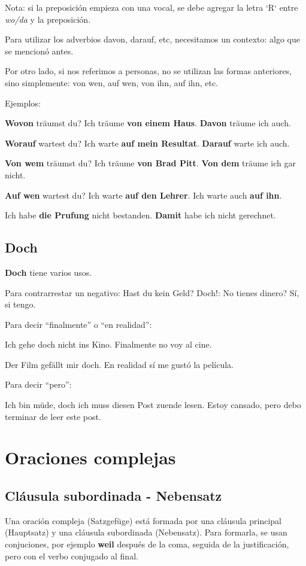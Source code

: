 Nota: si la preposición empieza con una vocal, se debe agregar la letra `R` entre \textit{wo/da} y la preposición. 

Para utilizar los adverbios davon, darauf, etc, necesitamos un contexto: algo que se mencionó antes. 

Por otro lado, si nos referimos a personas, no se utilizan las formas anteriores, sino simplemente: von wen, auf wen, von ihn, auf ihn, etc.

Ejemplos:

\textbf{Wovon} träumst du? Ich träume \textbf{ von einem Haus}. \textbf{Davon} träume ich auch.

\textbf{Worauf} wartest du? Ich warte \textbf{auf mein Resultat}. \textbf{Darauf} warte ich auch.

\textbf{Von wem} träumst du? Ich träume \textbf{von Brad Pitt}. \textbf{Von dem} träume ich gar nicht.

\textbf{Auf wen} wartest du? Ich warte \textbf{auf den Lehrer}. Ich warte auch \textbf{auf ihn}.

Ich habe \textbf{die Prufung} nicht bestanden. \textbf{Damit} habe ich nicht gerechnet.

\subsection{Doch}
\textbf{Doch} tiene varios usos.

Para contrarrestar un negativo:
Hast du kein Geld? Doch!: No tienes dinero? Sí, si tengo.

Para decir ``finalmente'' o ``en realidad'':
\begin{myitemize}
\item Ich gehe doch nicht ins Kino. Finalmente no voy al cine.
\item Der Film gefällt mir doch. En realidad sí me gustó la película.
\end{myitemize}

Para decir ``pero'':
\begin{myitemize}
\item Ich bin müde, doch ich muss diesen Post zuende lesen. Estoy cansado, pero debo terminar de leer este post.
\end{myitemize}


\section{Oraciones complejas}
\subsection{Cláusula subordinada - Nebensatz}
Una oración compleja (Satzgefüge) está formada por una cláusula principal (Hauptsatz) y una cláusula subordinada (Nebensatz). Para formarla, se usan conjuciones, por ejemplo \textbf{weil} después de la coma, seguida de la justificación, pero con el verbo conjugado al final.

